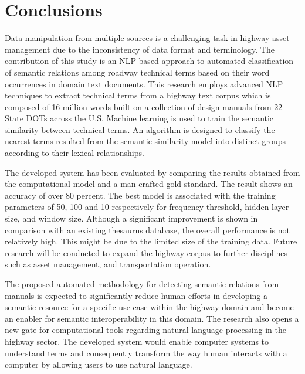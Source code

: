 \documentclass[Journal, BackFigs,NoLists, DoubleSpace]{ascelike}%
\begin{document}
\section{Conclusions} \label{sec:conclns3} 
Data manipulation from multiple sources is a challenging task in highway asset management due to the inconsistency of data format and terminology. The contribution of this study is an NLP-based approach to automated classification of semantic relations among roadway technical terms based on their word occurrences in domain text documents. This research employs advanced NLP techniques to extract technical terms from a highway text corpus which is composed of 16 million words built on a collection of design manuals from 22 State DOTs across the U.S. Machine learning is used to train the semantic similarity between technical terms. An algorithm is designed to classify the nearest terms resulted from the semantic similarity model into distinct groups according to their lexical relationships. 
\par
The developed system has been evaluated by comparing the results obtained from the computational model and a man-crafted gold standard. The result shows an accuracy of over 80 percent. The best model is associated with the training parameters of 50, 100 and 10 respectively for frequency threshold, hidden layer size, and window size. Although a significant improvement is shown in comparison with an existing thesaurus database, the overall performance is not relatively high. This might be due to the limited size of the training data. Future research will be conducted to expand the highway corpus to further disciplines such as asset management, and transportation operation. 
\par
The proposed automated methodology for detecting semantic relations from manuals is expected to significantly reduce human efforts in developing a semantic resource for a specific use case within the highway domain and become an enabler for semantic interoperability in this domain. The research also opens a new gate for computational tools regarding natural language processing in the highway sector. The developed system would enable computer systems to understand terms and consequently transform the way human interacts with a computer by allowing users to use natural language.


%
\listoffigures
\end{document}
